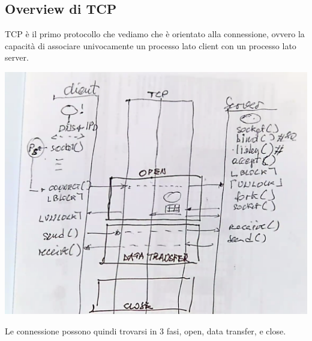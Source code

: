 \documentclass[11pt, oneside]{article}   	%
\begin{document}
\subsection*{Overview di TCP}
TCP è il primo protocollo che vediamo che è orientato alla connessione, ovvero la capacità di associare univocamente un processo lato client con un processo lato server. 
\begin{center}
\includegraphics[scale=0.5]{t3}
\end{center}
Le connessione possono quindi trovarsi in 3 fasi, open, data transfer, e close.
\end{document}
